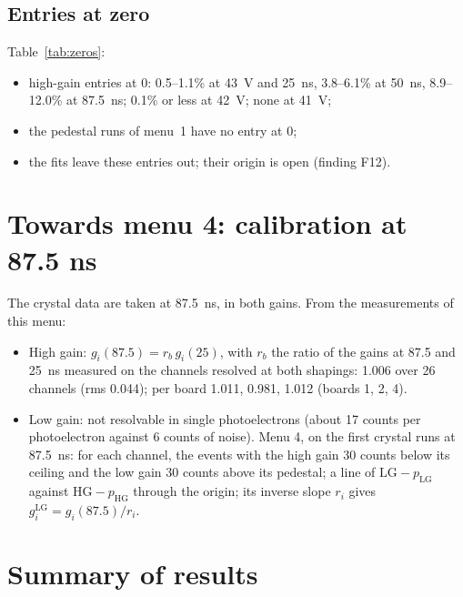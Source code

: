 \documentclass[11pt,a4paper]{article}
\newcommand{\results}{../../../fullsim_analysis/results/bench/2026-10-27}
\begin{document}
\subsection{Entries at zero}

\begin{table}[H]
\centering
\small

\caption{Fraction of the high-gain entries at 0, in percent, median over the channels of each
board.}
\label{tab:zeros}
\end{table}

Table~\ref{tab:zeros}:
\begin{itemize}
\item high-gain entries at 0: 0.5--1.1\% at 43~V and 25~ns, 3.8--6.1\% at 50~ns, 8.9--12.0\%
  at 87.5~ns; 0.1\% or less at 42~V; none at 41~V;
\item the pedestal runs of menu~1 have no entry at 0;
\item the fits leave these entries out; their origin is open (finding F12).
\end{itemize}

\section{Towards menu 4: calibration at 87.5 ns}

The crystal data are taken at 87.5~ns, in both gains. From the measurements of this menu:
\begin{itemize}
\item High gain: $g_i(87.5) = r_b\, g_i(25)$, with $r_b$ the ratio of the gains at 87.5 and
  25~ns measured on the channels resolved at both shapings: 1.006 over 26 channels (rms
  0.044); per board 1.011, 0.981, 1.012 (boards 1, 2, 4).
\item Low gain: not resolvable in single photoelectrons (about 17 counts per photoelectron
  against 6 counts of noise). Menu 4, on the first crystal runs at 87.5~ns: for each channel,
  the events with the high gain 30 counts below its ceiling and the low gain 30 counts above
  its pedestal; a line of $\mathrm{LG} - p_\mathrm{LG}$ against $\mathrm{HG} - p_\mathrm{HG}$
  through the origin; its inverse slope $r_i$ gives $g^\mathrm{LG}_i = g_i(87.5) / r_i$.
\end{itemize}

\section{Summary of results}
\end{document}
